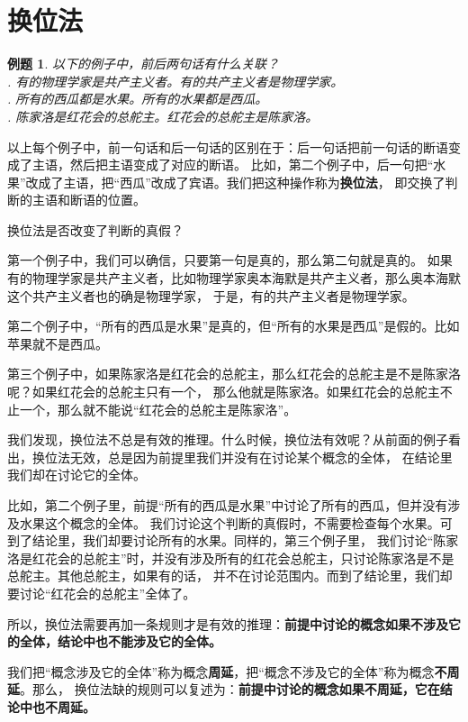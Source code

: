 \documentclass[12pt,UTF8]{ctexbook}
\newtheorem{et}{例题}[section]
\begin{document}
\section{换位法}
\begin{et}\label{et:2b-1-0} 
    以下的例子中，前后两句话有什么关联？\\
    . 有的物理学家是共产主义者。有的共产主义者是物理学家。\\
    . 所有的西瓜都是水果。所有的水果都是西瓜。\\
    . 陈家洛是红花会的总舵主。红花会的总舵主是陈家洛。
\end{et}
以上每个例子中，前一句话和后一句话的区别在于：后一句话把前一句话的断语变成了主语，然后把主语变成了对应的断语。
比如，第二个例子中，后一句把“水果”改成了主语，把“西瓜”改成了宾语。我们把这种操作称为\textbf{换位法}，
即交换了判断的主语和断语的位置。

换位法是否改变了判断的真假？

第一个例子中，我们可以确信，只要第一句是真的，那么第二句就是真的。
如果有的物理学家是共产主义者，比如物理学家奥本海默是共产主义者，那么奥本海默这个共产主义者也的确是物理学家，
于是，有的共产主义者是物理学家。

第二个例子中，“所有的西瓜是水果”是真的，但“所有的水果是西瓜”是假的。比如苹果就不是西瓜。

第三个例子中，如果陈家洛是红花会的总舵主，那么红花会的总舵主是不是陈家洛呢？如果红花会的总舵主只有一个，
那么他就是陈家洛。如果红花会的总舵主不止一个，那么就不能说“红花会的总舵主是陈家洛”。

我们发现，换位法不总是有效的推理。什么时候，换位法有效呢？从前面的例子看出，换位法无效，总是因为前提里我们并没有在讨论某个概念的全体，
在结论里我们却在讨论它的全体。

比如，第二个例子里，前提“所有的西瓜是水果”中讨论了所有的西瓜，但并没有涉及水果这个概念的全体。
我们讨论这个判断的真假时，不需要检查每个水果。可到了结论里，我们却要讨论所有的水果。同样的，第三个例子里，
我们讨论“陈家洛是红花会的总舵主”时，并没有涉及所有的红花会总舵主，只讨论陈家洛是不是总舵主。其他总舵主，如果有的话，
并不在讨论范围内。而到了结论里，我们却要讨论“红花会的总舵主”全体了。

所以，换位法需要再加一条规则才是有效的推理：\textbf{前提中讨论的概念如果不涉及它的全体，结论中也不能涉及它的全体。}

我们把“概念涉及它的全体”称为概念\textbf{周延}，把“概念不涉及它的全体”称为概念\textbf{不周延}。那么，
换位法缺的规则可以复述为：\textbf{前提中讨论的概念如果不周延，它在结论中也不周延。}
\end{document}
